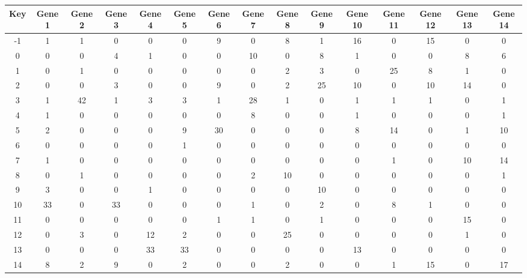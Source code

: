 \begin{tabular}{|c|c|c|c|c|c|c|c|c|c|c|c|c|c|c|}
\hline
Key & Gene 1 & Gene 2 & Gene 3 & Gene 4 & Gene 5 & Gene 6 & Gene 7 & Gene 8 & Gene 9 & Gene 10 & Gene 11 & Gene 12 & Gene 13 & Gene 14 \\
\hline
-1 & 1 & 1 & 0 & 0 & 0 & 9 & 0 & 8 & 1 & 16 & 0 & 15 & 0 & 0 \\
0 & 0 & 0 & 4 & 1 & 0 & 0 & 10 & 0 & 8 & 1 & 0 & 0 & 8 & 6 \\
1 & 0 & 1 & 0 & 0 & 0 & 0 & 0 & 2 & 3 & 0 & 25 & 8 & 1 & 0 \\
2 & 0 & 0 & 3 & 0 & 0 & 9 & 0 & 2 & 25 & 10 & 0 & 10 & 14 & 0 \\
3 & 1 & 42 & 1 & 3 & 3 & 1 & 28 & 1 & 0 & 1 & 1 & 1 & 0 & 1 \\
4 & 1 & 0 & 0 & 0 & 0 & 0 & 8 & 0 & 0 & 1 & 0 & 0 & 0 & 1 \\
5 & 2 & 0 & 0 & 0 & 9 & 30 & 0 & 0 & 0 & 8 & 14 & 0 & 1 & 10 \\
6 & 0 & 0 & 0 & 0 & 1 & 0 & 0 & 0 & 0 & 0 & 0 & 0 & 0 & 0 \\
7 & 1 & 0 & 0 & 0 & 0 & 0 & 0 & 0 & 0 & 0 & 1 & 0 & 10 & 14 \\
8 & 0 & 1 & 0 & 0 & 0 & 0 & 2 & 10 & 0 & 0 & 0 & 0 & 0 & 1 \\
9 & 3 & 0 & 0 & 1 & 0 & 0 & 0 & 0 & 10 & 0 & 0 & 0 & 0 & 0 \\
10 & 33 & 0 & 33 & 0 & 0 & 0 & 1 & 0 & 2 & 0 & 8 & 1 & 0 & 0 \\
11 & 0 & 0 & 0 & 0 & 0 & 1 & 1 & 0 & 1 & 0 & 0 & 0 & 15 & 0 \\
12 & 0 & 3 & 0 & 12 & 2 & 0 & 0 & 25 & 0 & 0 & 0 & 0 & 1 & 0 \\
13 & 0 & 0 & 0 & 33 & 33 & 0 & 0 & 0 & 0 & 13 & 0 & 0 & 0 & 0 \\
14 & 8 & 2 & 9 & 0 & 2 & 0 & 0 & 2 & 0 & 0 & 1 & 15 & 0 & 17 \\
\hline
\end{tabular}